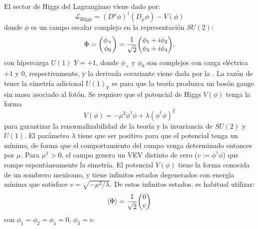 El sector de Higgs del Lagrangiano viene dado por:
\begin{equation}
    \mathcal{L}_{\text{Higgs}} = \left(D^{\mu} \phi\right)^{\dagger} \left(D_{\mu} \phi\right) - V(\phi)
\end{equation}
donde \(\phi\) es un campo escalar complejo en la representación \(SU(2)\):
\begin{equation}
    \Phi = \mqty( \phi_{+} \\ \phi_0 ) = \frac{1}{\sqrt{2}} \mqty(\phi_1 + i \phi_2 \\ \phi_3 + i \phi_4),
\end{equation}
con hipercarga \(U(1)\) \(Y=+1\), donde \(\phi_{+}\) y \(\phi_{0}\) son complejos con carga eléctrica \(+1\) y \(0\), respectivamente, y la derivada covariante viene dada por la \Eqn{\ref{eq:theory:sm:mathematical:ew:covariant_derivative}}. La razón de tener la simetría adicional \(U(1)_Y\) es para que la teoría produzca un bosón gauge sin masa asociado al fotón. Se requiere que el potencial de Higgs \(V(\phi)\) tenga la forma
\begin{equation}
    V(\phi) = -\mu^2 \phi^{\dagger} \phi + \lambda \left(\phi^{\dagger} \phi\right)^2
\end{equation}
para garantizar la renormalizabilidad de la teoría y la invariancia de \(SU(2)\) y \(U(1)\). El parámetro \(\lambda\) tiene que ser positivo para que el potencial tenga un mínimo, de forma que el comportamiento del campo venga determinado entonces por \(\mu\). Para \(\mu^2 > 0\), el campo genera un \ac{VEV} distinto de cero (\(v := \phi^{\dagger} \phi\)) que rompe espontáneamente la simetría. El potencial \(V(\phi)\) tiene la forma conocida de un sombrero mexicano, y tiene infinitos estados degenerados con energía mínima que satisface \(v = \sqrt{-\mu^2/\lambda}\). De estos infinitos estados, es habitual utilizar:
\begin{equation}
    \expval{\Phi} = \frac{1}{\sqrt{2}} \mqty(0\\v)
\end{equation}
con \(\phi_1 = \phi_2 = \phi_4 = 0\), \(\phi_3 = v\).

